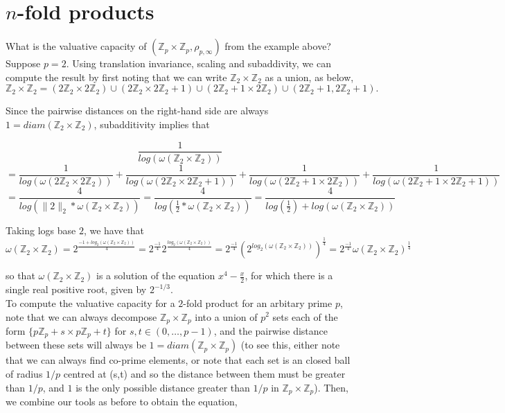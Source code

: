 \section*{ \textbf{$n$-fold products}}
What is the valuative capacity of  $(\mathbb{Z}_p \times \mathbb{Z}_p, \rho_{p,\infty})$  from the example above? Suppose $p=2$.  Using translation invariance, scaling and subaddivity, we can compute the result by first noting that we can write $\mathbb{Z}_2 \times \mathbb{Z}_2$ as a union, as below,
\[
\mathbb{Z}_2 \times \mathbb{Z}_2 = (2\mathbb{Z}_2 \times 2\mathbb{Z}_2) \cup (2\mathbb{Z}_2 \times 2\mathbb{Z}_2 +1) \cup (2\mathbb{Z}_2+1 \times 2\mathbb{Z}_2) \cup (2\mathbb{Z}_2+1, 2\mathbb{Z}_2+1).
\]

Since the pairwise distances on the right-hand side are always $1 = diam(\mathbb{Z}_2 \times \mathbb{Z}_2)$, subadditivity implies that 

\[
\frac{1}{log(\omega(\mathbb{Z}_2 \times \mathbb{Z}_2))} \]
\[ = \frac{1}{log(\omega(2\mathbb{Z}_2 \times 2\mathbb{Z}_2))} + \frac{1}{log(\omega(2\mathbb{Z}_2 \times 2\mathbb{Z}_2 +1))} + \frac{1}{log(\omega(2\mathbb{Z}_2+1 \times 2\mathbb{Z}_2))} + \frac{1}{log(\omega(2\mathbb{Z}_2+1 \times 2\mathbb{Z}_2+1))}\]
\[ = \frac{4}{log(\|2\|_2 * \omega(\mathbb{Z}_2 \times \mathbb{Z}_2))} = \frac{4}{log(\frac{1}{2} * \omega(\mathbb{Z}_2 \times \mathbb{Z}_2))} =  \frac{4}{log(\frac{1}{2}) + log(\omega(\mathbb{Z}_2 \times \mathbb{Z}_2))}\]

 Taking logs base $2$, we have that 
\[\omega(\mathbb{Z}_2 \times \mathbb{Z}_2) = 2^{\frac{-1 + log_2(\omega(\mathbb{Z}_2 \times \mathbb{Z}_2))}{4}} =  2^{\frac{-1}{4}} 2^ {\frac{log_2(\omega(\mathbb{Z}_2 \times \mathbb{Z}_2))}{4}}
= 2^{\frac{-1}{4}}{(2^ {log_2(\omega(\mathbb{Z}_2 \times \mathbb{Z}_2))})}^{\frac{1}{4}} = 2^{\frac{-1}{4}}{\omega(\mathbb{Z}_2 \times \mathbb{Z}_2)}^{\frac{1}{4}} \]

so that ${\omega(\mathbb{Z}_2 \times \mathbb{Z}_2)}$ is a solution of the equation $x^4 - \frac{x}{2}$, for which there is a single real positive root, given by $2^{-1/3}$.\\


To compute the valuative capacity for a $2$-fold product for an arbitary prime $p$, note that we can always decompose $\mathbb{Z}_p \times \mathbb{Z}_p$ into a union of $p^2$ sets each of the form $\{p\mathbb{Z}_p+s \times p\mathbb{Z}_p +t\}$ for $s,t \in (0,\ldots, p-1)$, and the pairwise distance between these sets will always be $1 = diam(\mathbb{Z}_p \times \mathbb{Z}_p)$ (to see this, either note that we can always find co-prime elements, or note that each set is an closed ball of radius $1/p$ centred at (s,t) and so the distance between them must be greater than $1/p$, and $1$ is the only possible distance greater than $1/p$ in $\mathbb{Z}_p \times \mathbb{Z}_p$).  Then, we combine our tools as before to obtain the equation,


